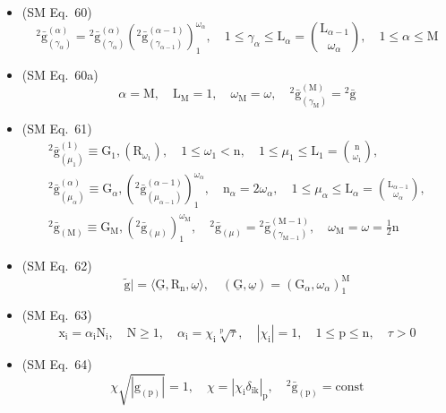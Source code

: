 \documentclass[12pt]{article}
\begin{document}
\begin{itemize}[label={},leftmargin=0pt]
    \item (SM Eq.\ 60) 
    \[
    {}^2\bar{\mathrm{g}}_{(\gamma_\alpha)}^{(\alpha)} = {}^2\bar{\mathrm{g}}_{(\gamma_\alpha)}^{(\alpha)} \left( {}^2\bar{\mathrm{g}}_{(\gamma_{\alpha-1})}^{(\alpha-1)} \right)_1^{\omega_\alpha}, \quad 1 \le \gamma_\alpha \le \mathrm{L}_\alpha = \binom{\mathrm{L}_{\alpha-1}}{\omega_\alpha}, \quad 1 \le \alpha \le \mathrm{M}
    \]

    \item (SM Eq.\ 60a) 
    \[
    \alpha = \mathrm{M}, \quad \mathrm{L}_{\mathrm{M}} = 1, \quad \omega_{\mathrm{M}} = \omega, \quad {}^2\bar{\mathrm{g}}_{(\gamma_{\mathrm{M}})}^{(\mathrm{M})} = {}^2\bar{\mathrm{g}}
    \]

    \item (SM Eq.\ 61) 
    \[
    \begin{gathered}
    {}^2\bar{\mathrm{g}}_{(\mu_1)}^{(1)} \equiv \mathrm{G}_1, \left(\mathrm{R}_{\omega_1}\right), \quad 1 \le \omega_1 < \mathrm{n}, \quad 1 \le \mu_1 \le \mathrm{L}_1 = \binom{\mathrm{n}}{\omega_1}, \\
    {}^2\bar{\mathrm{g}}_{(\mu_\alpha)}^{(\alpha)} \equiv \mathrm{G}_\alpha, \left( {}^2\bar{\mathrm{g}}_{(\mu_{\alpha-1})}^{(\alpha-1)} \right)_1^{\omega_\alpha}, \quad \mathrm{n}_\alpha = 2\omega_\alpha, \quad 1 \le \mu_\alpha \le \mathrm{L}_\alpha = \binom{\mathrm{L}_{\alpha-1}}{\omega_\alpha}, \\
    {}^2\bar{\mathrm{g}}_{(\mathrm{M})} \equiv \mathrm{G}_{\mathrm{M}}, \left( {}^2\bar{\mathrm{g}}_{(\mu)} \right)_1^{\omega_{\mathrm{M}}}, \quad {}^2\bar{\mathrm{g}}_{(\mu)} = {}^2\bar{\mathrm{g}}_{(\gamma_{\mathrm{M}-1})}^{(\mathrm{M}-1)}, \quad \omega_{\mathrm{M}} = \omega = \frac{1}{2}\mathrm{n}
    \end{gathered}
    \]

    \item (SM Eq.\ 62) 
    \[
    \tilde{\mathrm{g}}| = \langle \underline{\mathrm{G}}, \mathrm{R}_{\mathrm{n}}, \underline{\omega} \rangle, \quad (\underline{\mathrm{G}}, \underline{\omega}) = \left(\mathrm{G}_\alpha, \omega_\alpha\right)_1^{\mathrm{M}}
    \]

    \item (SM Eq.\ 63) 
    \[
    \mathrm{x_i} = \alpha_\mathrm{i} \mathrm{N_i}, \quad \mathrm{N} \ge 1, \quad \alpha_\mathrm{i} = \chi_\mathrm{i} \sqrt[\mathrm{p}]{\tau}, \quad |\chi_\mathrm{i}| = 1, \quad 1 \le \mathrm{p} \le \mathrm{n}, \quad \tau > 0
    \]

    \item (SM Eq.\ 64) 
    \[
    \chi \sqrt{|\mathrm{g}_{(\mathrm{p})}|} = 1, \quad \chi = |\chi_\mathrm{i} \delta_{\mathrm{ik}}|_\mathrm{p}, \quad {}^2\bar{\mathrm{g}}_{(\mathrm{p})} = \mathrm{const}
    \]


\end{itemize}
\end{document}

